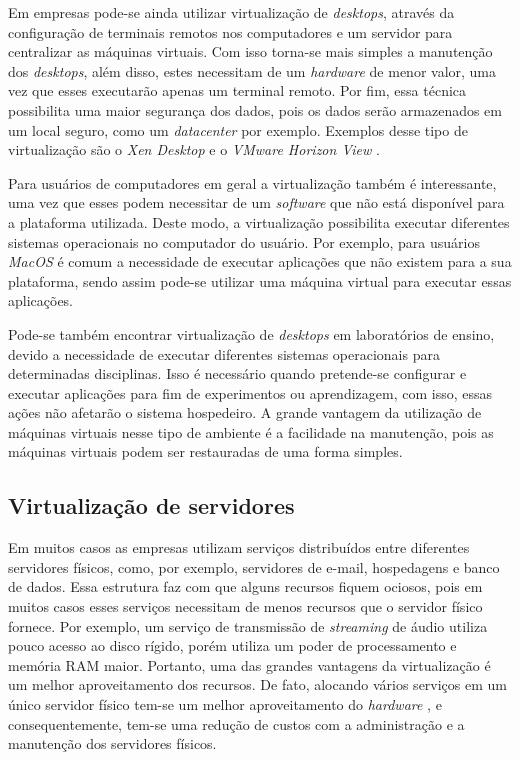 Em empresas pode-se ainda utilizar virtualização de \textit{desktops}, através da configuração de terminais remotos nos computadores e um servidor 
para centralizar as máquinas virtuais. Com isso torna-se mais simples a manutenção dos \textit{desktops}, além disso, estes necessitam de um 
\textit{hardware} de menor valor, uma vez que esses executarão apenas um terminal remoto. Por fim, essa técnica possibilita uma maior segurança 
dos dados, pois os dados serão armazenados em um local seguro, como um \textit{datacenter} por exemplo. Exemplos desse tipo de virtualização 
são o \textit{Xen Desktop} \cite{xendesktop} e o \textit{VMware Horizon View} \cite{vmwareview}.

Para usuários de computadores em geral a virtualização também é interessante, uma vez que esses podem necessitar de um \textit{software} que não
está disponível para a plataforma utilizada. Deste modo, a virtualização possibilita executar diferentes sistemas operacionais no computador do 
usuário. Por exemplo, para usuários \textit{MacOS} é comum a necessidade de executar aplicações que não existem para a sua plataforma, sendo 
assim pode-se utilizar uma máquina virtual para executar essas aplicações.

Pode-se também encontrar virtualização de \textit{desktops} em laboratórios de ensino, devido a necessidade de executar diferentes sistemas 
operacionais para determinadas disciplinas. Isso é necessário quando pretende-se configurar e executar aplicações para fim de experimentos ou
aprendizagem, com isso, essas ações não afetarão o sistema hospedeiro. A grande vantagem da utilização de máquinas virtuais nesse tipo de 
ambiente é a facilidade na manutenção, pois as máquinas virtuais podem ser restauradas de uma forma simples.

\subsection{Virtualização de servidores}
\label{section:virtdesk}

Em muitos casos as empresas utilizam serviços distribuídos entre diferentes servidores físicos, como, por exemplo, servidores de e-mail, 
hospedagens e banco de dados. Essa estrutura faz com que alguns recursos fiquem ociosos, pois em muitos casos esses serviços necessitam de menos
recursos que o servidor físico fornece. Por exemplo, um serviço de transmissão de \textit{streaming} de áudio utiliza pouco acesso ao disco rígido,
porém utiliza um poder de processamento e memória RAM maior. Portanto, uma das grandes vantagens da virtualização é um melhor aproveitamento dos 
recursos. De fato, alocando vários serviços em um único servidor físico tem-se um melhor aproveitamento do \textit{hardware} \cite{moreira2006}, 
e consequentemente, tem-se uma redução de custos com a administração e a manutenção dos servidores físicos.

